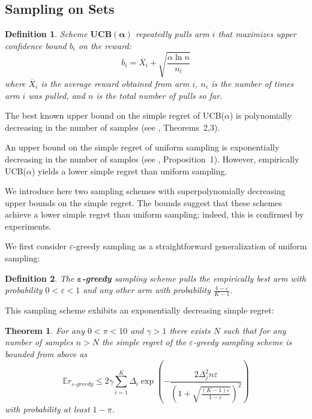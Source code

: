\documentclass[letterpaper]{article}
\newcommand {\IE} {\ensuremath {\mathbb{E}}}
\newtheorem{dfn}{Definition}
\newtheorem{thm}{Theorem}
\begin{document}
\subsection{Sampling on Sets}
\label{sec:sampling-on-sets}

\begin{dfn} Scheme $\mathbf{UCB(\alpha)}$ repeatedly pulls arm $i$ that maximizes 
upper confidence bound $b_i$ on the reward:
\begin{equation}
b_i=\overline X_i+\sqrt {\frac {\alpha \ln n} {n_i}}
\label{eqn:ucb}
\end{equation}
where $\overline X_i$ is the average reward obtained from arm $i$,
$n_i$ is the number of times arm $i$ was pulled, and $n$ is the total
number of pulls so far. \end{dfn} The best known upper bound on the simple
regret of UCB($\alpha$) is polynomially decreasing in the number of samples
(see \cite{Bubeck.pure}, Theorems~2,3).

An upper bound on the simple regret of uniform sampling is
exponentially decreasing in the number of samples (see
\cite{Bubeck.pure}, Proposition~1). However, empirically
UCB($\alpha$) yields a lower simple regret than uniform
sampling. 

We introduce here two sampling schemes with superpolynomially
decreasing upper bounds on the simple regret. The bounds
suggest that these schemes achieve a lower simple regret
than uniform sampling; indeed, this is confirmed
by experiments. 

We first consider $\varepsilon$-greedy sampling as a straightforward
generalization of uniform sampling:
\begin{dfn} The \textbf{$\mathbf{\varepsilon}$-greedy} sampling scheme
pulls the empirically best arm with probability
$0<\varepsilon<1$ and any other
arm with probability $\frac {1-\varepsilon} {K-1}$. 
\end{dfn}
This sampling scheme exhibits an exponentially decreasing simple regret:
\begin{thm} For any $0<\pi<10$  and $\gamma>1$ there exists $N$ such that for
  any number of samples $n>N$ the simple regret of the  $\varepsilon$-greedy
sampling scheme is  bounded from above as
\begin{equation}
\IE r_{\varepsilon\mbox{-}greedy}\le 2\gamma \sum_{i=1}^K\Delta_i\exp\left(-\frac {2\Delta_j^2n\varepsilon}
  {\left(1+\sqrt{\frac {(K-1)\varepsilon}
        {1-\varepsilon}}\right)^2}\right)
\end{equation}
with probability at least $1-\pi$.
\end{thm}
\end{document}
